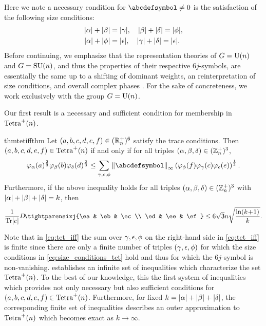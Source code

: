 \documentclass[notitlepage, 11pt, letterpaper]{amsart}
\begin{document}
Here we note a necessary condition for $\abcdefsymbol \neq 0$ is the satisfaction of the following size conditions:
\begin{align}
    \label{eq:size_conditions_tet}
    \begin{split}
        |\alpha| + |\beta| &= |\gamma|, \quad
        |\beta| + |\delta| = |\phi|, \\
        |\alpha| + |\phi| &= |\epsilon|, \quad
        |\gamma| + |\delta| = |\epsilon|.
    \end{split}
\end{align}
Before continuing, we emphasize that the representation theories of $G=\operatorname{U}(n)$ and $G=\operatorname{SU}(n)$, and thus the properties of their respective $6j$-symbols, are essentially the same up to a shifting of dominant weights, an reinterpretation of size conditions, and overall complex phases \cite{hall2008representations}.
For the sake of concreteness, we work exclusively with the group $G=\operatorname{U}(n)$.

Our first result is a necessary and sufficient condition for membership in $\operatorname{Tetra}^{+}(n)$.
\begin{restatable}{thm}{tetiffthm}
    \label{thm:tet_iff}
    Let $(a,b,c,d,e,f) \in (\mathbb R^{+}_{n})^6$ satisfy the trace conditions.
    Then $(a,b,c,d,e,f) \in \operatorname{Tetra}^{+}(n)$
    if and only if for all triples $(\alpha,\beta,\delta) \in (\mathbb Z^{+}_{n})^3$,
    \begin{equation}
        \label{eq:tet_iff}
        \vp_{\ya}(\ea)^{\frac{2}{3}}\vp_{\yb}(\eb)\vp_{\yd}(\ed)^{\frac{2}{3}}
        \leq \sum_{\yc,\ye,\yf} \norm{\abcdefsymbol}_{\infty}
        \left(\vp_{\yf}(\ef)\vp_{\yc}(\ec)\vp_{\ye}(\ee)\right)^{\frac{1}{3}}.
    \end{equation}
    Furthermore, if the above inequality holds for all triples $(\alpha,\beta,\delta) \in (\mathbb Z^{+}_{n})^3$ with $|\alpha| + |\beta| + |\delta| = k$, then
    \begin{equation}
        \label{eq:tet_dist_bound}
        \frac{1}{\tee} D\!\tightparensixj{\ea & \eb & \ec \\ \ed & \ee & \ef} \leq 6 \sqrt{3} n \sqrt{\frac{\ln \polyk{}}{k}}.
    \end{equation}
\end{restatable}
Note that in \cref{eq:tet_iff} the sum over $\gamma, \epsilon, \phi$ on the right-hand side in \cref{eq:tet_iff} is finite since there are only a finite number of triples $(\gamma, \epsilon, \phi)$ for which the size conditions in \cref{eq:size_conditions_tet} hold and thus for which the $6j$-symbol is non-vanishing.
 establishes an infinite set of inequalities which characterize the set $\operatorname{Tetra}^+(n)$.
To the best of our knowledge, this the first system of inequalities which provides not only necessary but also sufficient conditions for $(a,b,c,d,e,f) \in \operatorname{Tetra}^+(n)$.
Furthermore, for fixed $k = |\alpha| + |\beta| + |\delta|$, the corresponding finite set of inequalities describes an outer approximation to $\operatorname{Tetra}^+(n)$ which becomes exact as $k \to \infty$.
\end{document}
